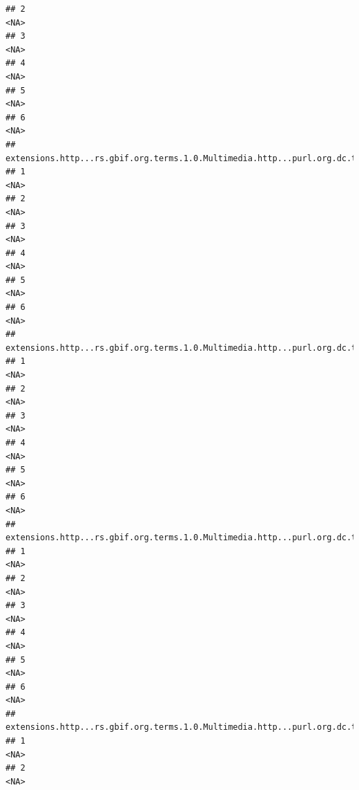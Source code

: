 \documentclass[
]{book}
\begin{document}
\begin{verbatim}
## 2                                                                                  <NA>
## 3                                                                                  <NA>
## 4                                                                                  <NA>
## 5                                                                                  <NA>
## 6                                                                                  <NA>
##   extensions.http...rs.gbif.org.terms.1.0.Multimedia.http...purl.org.dc.terms.created.9
## 1                                                                                  <NA>
## 2                                                                                  <NA>
## 3                                                                                  <NA>
## 4                                                                                  <NA>
## 5                                                                                  <NA>
## 6                                                                                  <NA>
##   extensions.http...rs.gbif.org.terms.1.0.Multimedia.http...purl.org.dc.terms.format.9
## 1                                                                                 <NA>
## 2                                                                                 <NA>
## 3                                                                                 <NA>
## 4                                                                                 <NA>
## 5                                                                                 <NA>
## 6                                                                                 <NA>
##   extensions.http...rs.gbif.org.terms.1.0.Multimedia.http...purl.org.dc.terms.references.9
## 1                                                                                     <NA>
## 2                                                                                     <NA>
## 3                                                                                     <NA>
## 4                                                                                     <NA>
## 5                                                                                     <NA>
## 6                                                                                     <NA>
##   extensions.http...rs.gbif.org.terms.1.0.Multimedia.http...purl.org.dc.terms.creator.9
## 1                                                                                  <NA>
## 2                                                                                  <NA>

\end{verbatim}
\end{document}
